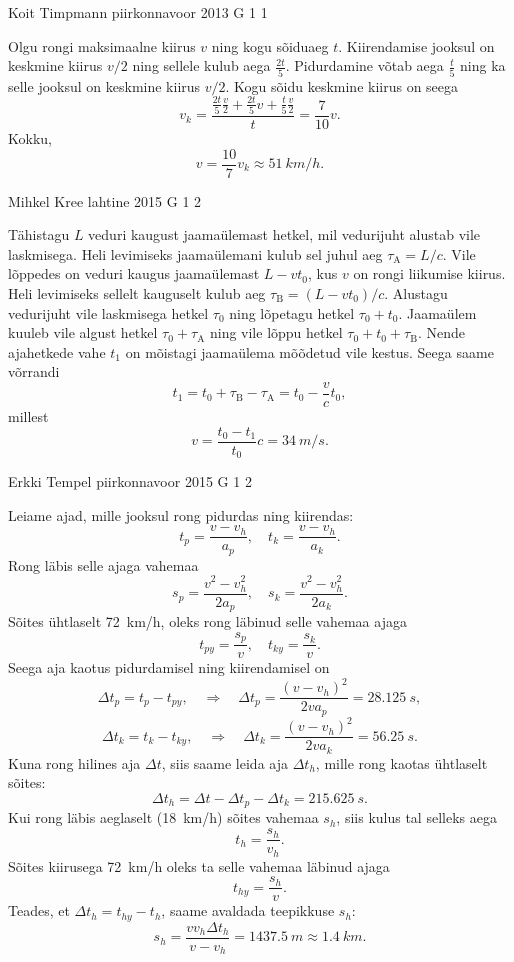 \documentclass[11pt, twoside]{article}
\begin{document}
{%
{Koit Timpmann} %
{piirkonnavoor} %
{2013} %
{G 1} %
{1} %
{

\ifSolution
Olgu rongi maksimaalne kiirus $v$ ning kogu sõiduaeg $t$. Kiirendamise jooksul on keskmine kiirus $v/2$ ning sellele kulub aega $\frac{2t}{5}$. Pidurdamine võtab aega $\frac{t}{5}$ ning ka selle jooksul on keskmine kiirus $v/2$. Kogu sõidu keskmine kiirus on seega 
$$v_k = \frac{\frac{2t}{5} \frac{v}{2}+\frac{2t}{5} v + \frac{t}{5} \frac{v}{2}}{t} = \frac{7}{10} v.$$ 
Kokku,
\[
v=\frac{10}{7}v_k \approx \SI{51}{km/h}.
\]
\fi
}

{Mihkel Kree} %
{lahtine} %
{2015} %
{G 1} %
{2} %
{

\ifSolution
Tähistagu $L$ veduri kaugust jaamaülemast hetkel, mil vedurijuht alustab vile laskmisega. Heli levimiseks jaamaülemani kulub sel juhul aeg $\tau_\text{A}=L/c$. Vile lõppedes on veduri kaugus jaamaülemast $L-vt_0$, kus $v$ on rongi liikumise kiirus. Heli levimiseks sellelt kauguselt kulub aeg $\tau_\text{B}=(L-vt_0)/c$. Alustagu vedurijuht vile laskmisega hetkel $\tau_0$ ning lõpetagu hetkel $\tau_0+t_0$. Jaamaülem kuuleb vile algust hetkel $\tau_0+\tau_\text{A}$ ning vile lõppu hetkel $\tau_0+t_0+\tau_\text{B}$. Nende ajahetkede vahe $t_1$ on mõistagi jaamaülema mõõdetud vile kestus. Seega saame võrrandi
\[
t_1 = t_0+\tau_\text{B}-\tau_\text{A} = t_0 - \frac{v}{c}t_0,
\]
millest
\[
v = \frac{t_0-t_1}{t_0}c = \SI{34}{m/s}.
\]
\fi
}

{Erkki Tempel} %
{piirkonnavoor} %
{2015} %
{G 1} %
{2} %
{

\ifSolution
Leiame ajad, mille jooksul rong pidurdas ning kiirendas:
\[ t_p = \frac{v - v_h}{a_p},\quad t_k = \frac{v-v_h}{a_k}. \]
Rong läbis selle ajaga vahemaa
\[ s_p = \frac{v^2-v_h^2}{2a_p}, \quad s_k = \frac{v^2-v_h^2}{2a_k}. \]
Sõites ühtlaselt \SI{72}{km/h}, oleks rong läbinud selle vahemaa ajaga
\[ t_{py} = \frac{s_p}{v},\quad t_{ky} =\frac{s_k}{v}. \]
Seega aja kaotus pidurdamisel ning kiirendamisel on 
\[ \Delta t_p = t_{p} - t_{py}, \quad\Rightarrow\quad \Delta t_p = \frac{(v-v_h)^2}{2va_p}=\SI{28,125}{s},\]
\[ \Delta t_k = t_{k} - t_{ky}, \quad\Rightarrow\quad \Delta t_k = \frac{(v-v_h)^2}{2va_k}=\SI{56,25}{s}.\]
Kuna rong hilines aja $\Delta t$, siis saame leida aja $\Delta t_h$, mille rong kaotas ühtlaselt sõites:
\[ \Delta t_h = \Delta t - \Delta t_p - \Delta t_k = \SI{215,625}{s}. \]
Kui rong läbis aeglaselt (\SI{18}{km/h}) sõites vahemaa $s_h$, siis kulus tal selleks aega
\[ t_h = \frac{s_h}{v_h}. \]
Sõites kiirusega \SI{72}{km/h} oleks ta selle vahemaa läbinud ajaga
\[ t_{hy} = \frac{s_h}{v}. \]
Teades, et $\Delta t_h = t_{hy} - t_h$, saame avaldada teepikkuse $s_h$:
\[ s_h = \frac{vv_h\Delta t_h}{v-v_h} = \SI{1437,5}{m} \approx \SI{1,4}{km}.\] 
\fi
}

}
\end{document}

